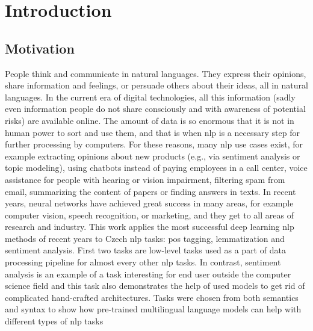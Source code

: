 \chapter*{Introduction}
\section*{Motivation}
People think and communicate in natural languages. They express their opinions, share information and feelings, or persuade others about their ideas, all in natural languages. In the current era of digital technologies, all this information (sadly even information people do not share consciously and with awareness of potential risks) are available online. The amount of data is so enormous that it is not in human power to sort and use them, and that is when \acrshort{nlp} is a necessary step for further processing by computers. For these reasons, many \acrshort{nlp} use cases exist, for example extracting opinions about new products (e.g., via sentiment analysis or topic modeling), using chatbots instead of paying employees in a call center, voice assistance for people with hearing or vision impairment, filtering spam from email, summarizing the content of papers or finding answers in texts. In recent years, neural networks have achieved great success in many areas, for example computer vision, speech recognition, or marketing, and they  get to all areas of research and industry. This work applies the most successful deep learning \gls{nlp} methods of recent years to Czech \acrlong{nlp} tasks: \acrlong{pos} tagging, lemmatization and sentiment analysis. First two tasks are low-level tasks used as a part of data processing pipeline for almost every other \acrshort{nlp} tasks. In contrast, sentiment analysis is an example of a task interesting for end user outside the computer science field and this task also demonstrates the help of used models to get rid of complicated hand-crafted architectures. Tasks were chosen from both semantics and syntax to show how pre-trained multilingual language models can help with different types of \gls{nlp} tasks
